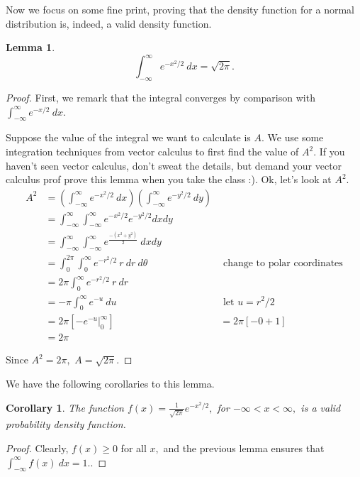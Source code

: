 \documentclass[
]{book}
\newtheorem{lemma}{Lemma}[chapter]
\newtheorem{corollary}{Corollary}[chapter]
\theoremstyle{definition}
\theoremstyle{definition}
\theoremstyle{definition}
\theoremstyle{definition}
\theoremstyle{remark}
\begin{document}
Now we focus on some fine print, proving that the density function for a normal distribution is, indeed, a valid density function.

\begin{lemma}
\[\int_{-\infty}^{\infty} e^{-x^2/2}~dx = \sqrt{2\pi}.\]
\end{lemma}

\begin{proof}
First, we remark that the integral converges by comparison with \(\displaystyle \int_{-\infty}^{\infty} e^{-x/2}~dx.\)

Suppose the value of the integral we want to calculate is \(A\). We use some integration techniques from vector calculus to first find the value of \(A^2\). If you haven't seen vector calculus, don't sweat the details, but demand your vector calculus prof prove this lemma when you take the class :). Ok, let's look at \(A^2\).
\begin{align*}
A^2 &= \left(\int_{-\infty}^{\infty} e^{-x^2/2}~dx \right)\left(\int_{-\infty}^{\infty} e^{-y^2/2}~dy \right)\\
    &= \int_{-\infty}^{\infty} \int_{-\infty}^{\infty} e^{-x^2/2} e^{-y^2/2} dx dy \\
    &= \int_{-\infty}^{\infty} \int_{-\infty}^{\infty} e^\frac{-(x^2+y^2)}{2} ~dx dy \\
    &= \int_0^{2\pi}\int_0^\infty e^{-r^2/2}~r ~dr~ d\theta &\text{ change to polar coordinates}\\
    &= 2\pi \int_0^\infty e^{-r^2/2}~r ~dr \\
    &= -\pi \int_0^\infty e^{-u} ~du & \text{ let } u = r^2/2 \\
    &= 2\pi \left[-e^{-u} \biggr|_0^\infty \right]
    &= 2\pi [-0 + 1] \\
    &= 2\pi
\end{align*}

Since \(A^2 = 2\pi,\) \(A = \sqrt{2\pi}\).
\end{proof}

We have the following corollaries to this lemma.

\begin{corollary}
The function \(f(x) = \frac{1}{\sqrt{2\pi}}e^{-x^2/2},\) for \(-\infty < x < \infty,\) is a valid probability density function.
\end{corollary}

\begin{proof}
Clearly, \(f(x) \geq 0\) for all \(x,\) and the previous lemma ensures that \(\int_{-\infty}^\infty f(x)~dx = 1.\).
\end{proof}
\end{document}
